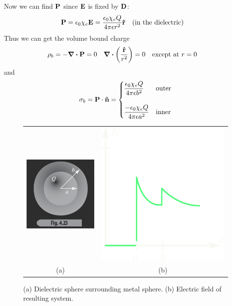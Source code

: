 \documentclass[../main.tex]{subfiles}
\begin{document}
Now we can find $\vb P$ since $\vb E$ is fixed by $\vb D$:
\begin{align*}
    \vb P = \epsilon_0 \chi_e \vb E = \frac{\epsilon_0 \chi_e Q}{4\pi \epsilon r^2} \vu r \qqtext{(in the dielectric)}
\end{align*}
Thus we can get the volume bound charge 
\begin{align*}
    \rho_b = -\div \vb P = 0 \quad \div(\frac{\vu r}{r^2}) = 0 \qqtext{except at $r = 0$}
\end{align*}
and
\begin{align*}
    \sigma_b = \vb P \cdot \vu n = \begin{cases}
        \dfrac{\epsilon_0 \chi_e Q}{4\pi \epsilon b^2} & \text{outer} \\ \\
        \dfrac{-\epsilon_0 \chi_e Q}{4\pi \epsilon a^2} & \text{inner}
    \end{cases}
\end{align*}

\begin{figure}[ht]
    \centering
    \begin{tabular}{cc}
        \includegraphics[width=0.3\linewidth]{fig4_23.png} & \includegraphics[width=0.3\linewidth]{fig4_23b.png} \\
        (a) & (b)
    \end{tabular}
    \caption{(a) Dielectric sphere surrounding metal sphere. (b) Electric field of resulting system.}
    \label{fig:4_23}
\end{figure}

\newpage
{}
\end{document}
